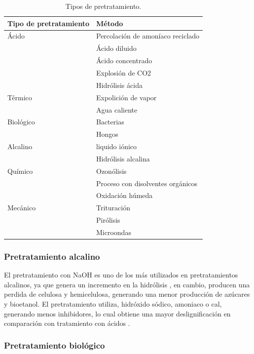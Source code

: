 \documentclass[12pt]{article}
\begin{document}
		\begin{table}[H]
		\centering  
		\caption{Tipos de pretratamiento. }%
		\begin{tabular}{  | p{5cm} | p{6.5cm} |}
		\hline\textbf{ Tipo de pretratamiento} & \textbf{ Método}\\ \hline 
		Ácido     & Percolación de amoníaco reciclado  \\ 
		&  Ácido diluido  \\
		&  Ácido concentrado \\
		&   Explosión de CO2  \\ 
		&   Hidrólisis ácida \\ \hline 
		Térmico   & Expolición de vapor\\
		&  Agua caliente \\ \hline
		Biológico & Bacterias \\
		&  Hongos \\ \hline
		Alcalino  & liquido iónico  \\
		& Hidrólisis alcalina \\ \hline
		Químico   & Ozonólisis\\
		&  Proceso con disolventes orgánicos\\
		& Oxidación húmeda \\ \hline
		Mecánico  & Trituración \\
		&  Pirólisis \\
		&  Microondas \\ \hline
		
		\end{tabular}
		\label{tipos de pretratamientos}
	\end{table}


\subsubsection{Pretratamiento alcalino}

El pretratamiento con NaOH es uno de los más utilizados en pretratamientos alcalinos,  ya que genera un incremento en la hidrólisis \cite{espinosa2021pretratamiento}, en cambio, producen una perdida de celulosa y hemicelulosa, generando una menor producción de azúcares y bioetanol.
El pretratamiento utiliza, hidróxido sódico, amoniaco o cal, generando menos inhibidores, lo cual obtiene una mayor deslignificación en comparación con tratamiento con ácidos \cite{valles2022estudio}.

\subsubsection{Pretratamiento biológico }
\end{document}
